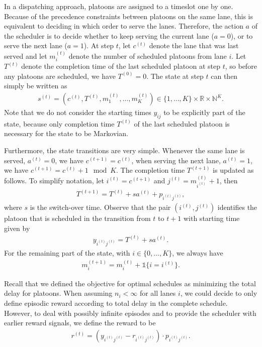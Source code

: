 \documentclass{article}
\theoremstyle{definition}
\theoremstyle{plain}
\begin{document}
In a dispatching approach, platoons are assigned to a timeslot one by one.
Because of the precedence constraints between platoons on the same lane, this is
equivalent to deciding in which order to serve the lanes. Therefore, the action
$a$ of the scheduler is to decide whether to keep serving the current lane
($a = 0$), or to serve the next lane ($a = 1$).
At step $t$, let $c^{(t)}$ denote the lane that was last served and let
$m_{i}^{(t)}$ denote the number of scheduled platoons from lane $i$. Let
$T^{(t)}$ denote the completion time of the last scheduled platoon at step $t$,
so before any platoons are scheduled, we have $T^{(0)} = 0$. The state at step
$t$ can then simply be written as
\begin{align}
   s^{(t)} = (c^{(t)}, T^{(t)}, m_{1}^{(t)}, \dots, m_{K}^{(t)} ) \in \{1, \dots, K\} \times \mathbb{R} \times \mathbb{N}^{K} .
\end{align}
Note that we do not consider the starting times $y_{ij}$ to be explicitly part
of the state, because only completion time $T^{(t)}$ of the last scheduled
platoon is necessary for the state to be Markovian.

Furthermore, the state transitions are very simple. Whenever the same lane is
served, $a^{(t)}=0$, we have $c^{(t+1)} = c^{(t)}$, when serving the next lane,
$a^{(t)}=1$, we have $c^{(t+1)} = c^{(t)} + 1 \mod K$. The completion time
$T^{(t+1)}$ is updated as follows. To simplify notation, let
$i^{(t)} = c^{(t+1)}$ and $j^{(t)} = m_{i^{(t)}}^{(t)} + 1$, then
\begin{align}
  T^{(t+1)} = T^{(t)} + s a^{(t)} + p_{i^{(t)}j^{(t)}} ,
\end{align}
where $s$ is the switch-over time. Observe that the pair $(i^{(t)}, j^{(t)})$
identifies the platoon that is scheduled in the transition from $t$ to $t+1$
with starting time given by
\begin{align}
  y_{i^{(t)}j^{(t)}} = T^{(t)} + s a^{(t)} .
\end{align}
For the remaining part of the state, with $i \in \{0, \dots, K\}$, we always
have
\begin{align}
  m_{i}^{(t+1)} = m_{i}^{(t)} + \mathbb{1}\{ i = i^{(t)} \} .
\end{align}

Recall that we defined the objective for optimal schedules as minimizing the
total delay for platoons. When assuming $n_{i} < \infty$ for all lanes $i$, we
could decide to only define episodic reward according to total delay in the
complete schedule. However, to deal with possibly infinite episodes and to
provide the scheduler with earlier reward signals, we define the reward to be
\begin{align}
  r^{(t)} = (y_{i^{(t)}j^{(t)}} - r_{i^{(t)}j^{(t)}}) \cdot p_{i^{(t)}j^{(t)}} .
\end{align}
\end{document}
